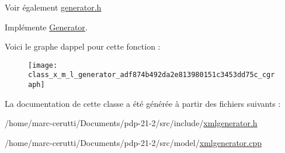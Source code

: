 \begin{DoxySeeAlso}{Voir également}
\hyperlink{generator_8h}{generator.\+h} 
\end{DoxySeeAlso}


Implémente \hyperlink{class_generator_a0a421843bba544df32c3e10478eaabc7}{Generator}.

Voici le graphe d\textquotesingle{}appel pour cette fonction \+:\nopagebreak
\begin{figure}[H]
\begin{center}
\leavevmode
\texttt{[image: class\_x\_m\_l\_generator\_adf874b492da2e813980151c3453dd75c\_cgraph]}
\end{center}
\end{figure}


La documentation de cette classe a été générée à partir des fichiers suivants \+:\begin{DoxyCompactItemize}
\item 
/home/marc-\/cerutti/\+Documents/pdp-\/21-\/2/src/include/\hyperlink{xmlgenerator_8h}{xmlgenerator.\+h}\item 
/home/marc-\/cerutti/\+Documents/pdp-\/21-\/2/src/model/\hyperlink{xmlgenerator_8cpp}{xmlgenerator.\+cpp}\end{DoxyCompactItemize}
